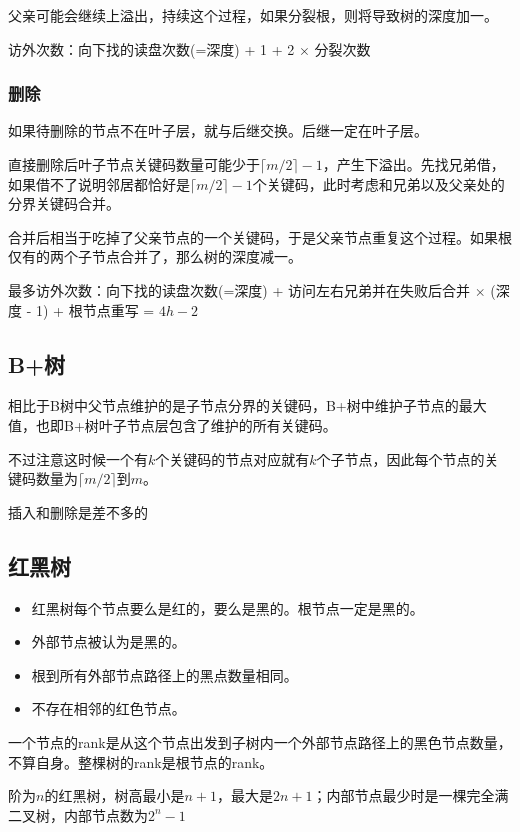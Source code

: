 \documentclass[8pt]{article}
\begin{document}
父亲可能会继续上溢出，持续这个过程，如果分裂根，则将导致树的深度加一。

访外次数：向下找的读盘次数(=深度) + 1 + 2 $\times$ 分裂次数

\subsubsection{删除}

如果待删除的节点不在叶子层，就与后继交换。后继一定在叶子层。

直接删除后叶子节点关键码数量可能少于$\lceil m/2 \rceil - 1$，产生下溢出。先找兄弟借，如果借不了说明邻居都恰好是$\lceil m/2 \rceil - 1$个关键码，此时考虑和兄弟以及父亲处的分界关键码合并。

合并后相当于吃掉了父亲节点的一个关键码，于是父亲节点重复这个过程。如果根仅有的两个子节点合并了，那么树的深度减一。

最多访外次数：向下找的读盘次数(=深度) + 访问左右兄弟并在失败后合并 $\times$ (深度 - 1) + 根节点重写 = $4h - 2$

\subsection{B+树}

相比于B树中父节点维护的是子节点分界的关键码，B+树中维护子节点的最大值，也即B+树叶子节点层包含了维护的所有关键码。

不过注意这时候一个有$k$个关键码的节点对应就有$k$个子节点，因此每个节点的关键码数量为$\lceil m/2 \rceil$到$m$。

插入和删除是差不多的

\subsection{红黑树}

\begin{itemize}
	\item 红黑树每个节点要么是红的，要么是黑的。根节点一定是黑的。
	\item 外部节点被认为是黑的。
	\item 根到所有外部节点路径上的黑点数量相同。
	\item 不存在相邻的红色节点。
\end{itemize}

一个节点的rank是从这个节点出发到子树内一个外部节点路径上的黑色节点数量，不算自身。整棵树的rank是根节点的rank。

阶为$n$的红黑树，树高最小是$n+1$，最大是$2n+1$；内部节点最少时是一棵完全满二叉树，内部节点数为$2^n-1$
\end{document}
